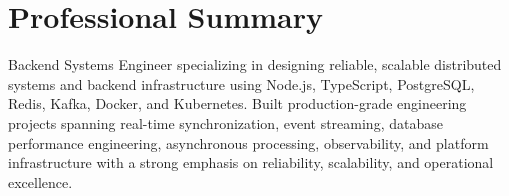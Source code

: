 \section*{Professional Summary}

Backend Systems Engineer specializing in designing reliable, scalable distributed systems and backend infrastructure using Node.js, TypeScript, PostgreSQL, Redis, Kafka, Docker, and Kubernetes. Built production-grade engineering projects spanning real-time synchronization, event streaming, database performance engineering, asynchronous processing, observability, and platform infrastructure with a strong emphasis on reliability, scalability, and operational excellence.
